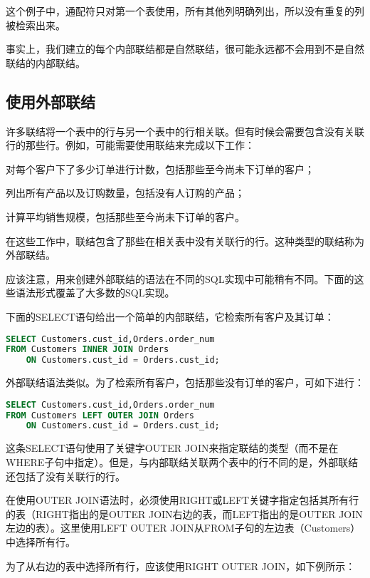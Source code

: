 这个例子中，通配符只对第一个表使用，所有其他列明确列出，所以没有重复的列被检索出来。


事实上，我们建立的每个内部联结都是自然联结，很可能永远都不会用到不是自然联结的内部联结。
\subsection{使用外部联结}


许多联结将一个表中的行与另一个表中的行相关联。但有时候会需要包含没有关联行的那些行。例如，可能需要使用联结来完成以下工作：

\begin{compactitem}
\item 对每个客户下了多少订单进行计数，包括那些至今尚未下订单的客户；
\item 列出所有产品以及订购数量，包括没有人订购的产品；
\item 计算平均销售规模，包括那些至今尚未下订单的客户。
\end{compactitem}


在这些工作中，联结包含了那些在相关表中没有关联行的行。这种类型的联结称为外部联结。

应该注意，用来创建外部联结的语法在不同的SQL实现中可能稍有不同。下面的这些语法形式覆盖了大多数的SQL实现。

下面的SELECT语句给出一个简单的内部联结，它检索所有客户及其订单：

\begin{lstlisting}[language=SQL]
SELECT Customers.cust_id,Orders.order_num
FROM Customers INNER JOIN Orders
	ON Customers.cust_id = Orders.cust_id;
\end{lstlisting}

外部联结语法类似。为了检索所有客户，包括那些没有订单的客户，可如下进行：

\begin{lstlisting}[language=SQL]
SELECT Customers.cust_id,Orders.order_num
FROM Customers LEFT OUTER JOIN Orders
	ON Customers.cust_id = Orders.cust_id;
\end{lstlisting}

这条SELECT语句使用了关键字OUTER JOIN来指定联结的类型（而不是在WHERE子句中指定）。但是，与内部联结关联两个表中的行不同的是，外部联结还包括了没有关联行的行。

在使用OUTER JOIN语法时，必须使用RIGHT或LEFT关键字指定包括其所有行的表（RIGHT指出的是OUTER JOIN右边的表，而LEFT指出的是OUTER JOIN左边的表）。这里使用LEFT OUTER JOIN从FROM子句的左边表（Customers）中选择所有行。

为了从右边的表中选择所有行，应该使用RIGHT OUTER JOIN，如下例所示：


